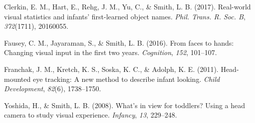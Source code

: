 \documentclass[10pt, letterpaper]{article}
\begin{document}
\noindent

\hypertarget{refs}{}
\leavevmode\hypertarget{ref-clerkin2017}{}%
Clerkin, E. M., Hart, E., Rehg, J. M., Yu, C., \& Smith, L. B. (2017).
Real-world visual statistics and infants' first-learned object names.
\emph{Phil. Trans. R. Soc. B}, \emph{372}(1711), 20160055.

\leavevmode\hypertarget{ref-fausey2016}{}%
Fausey, C. M., Jayaraman, S., \& Smith, L. B. (2016). From faces to
hands: Changing visual input in the first two years. \emph{Cognition},
\emph{152}, 101--107.

\leavevmode\hypertarget{ref-franchak2011}{}%
Franchak, J. M., Kretch, K. S., Soska, K. C., \& Adolph, K. E. (2011).
Head-mounted eye tracking: A new method to describe infant looking.
\emph{Child Development}, \emph{82}(6), 1738--1750.

\leavevmode\hypertarget{ref-yoshida2008}{}%
Yoshida, H., \& Smith, L. B. (2008). What's in view for toddlers? Using
a head camera to study visual experience. \emph{Infancy}, \emph{13},
229--248.


\end{document}
